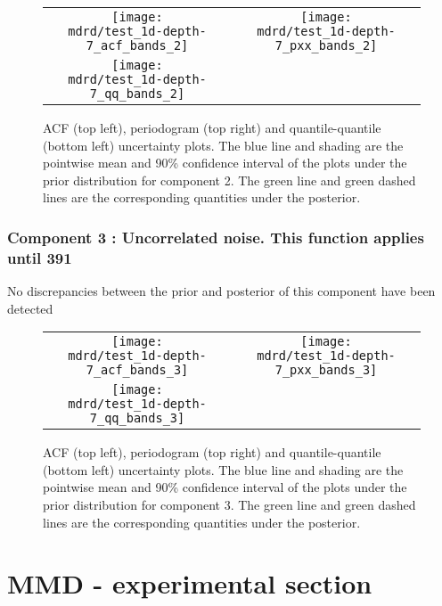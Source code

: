 \documentclass{article} %
\begin{document}
\begin{figure}[H]
\newcommand{\wmgd}{0.5\columnwidth}
\newcommand{\hmgd}{3.0cm}
\newcommand{\mdrd}{test_1d-depth-7}
\newcommand{\mbm}{\hspace{-0.3cm}}
\begin{tabular}{cc}
\mbm \texttt{[image: \\mdrd/test\_1d-depth-7\_acf\_bands\_2]} & \texttt{[image: \\mdrd/test\_1d-depth-7\_pxx\_bands\_2]} \\
\mbm \texttt{[image: \\mdrd/test\_1d-depth-7\_qq\_bands\_2]}
\end{tabular}
\caption{
ACF (top left), periodogram (top right) and quantile-quantile (bottom left) uncertainty plots.
The blue line and shading are the pointwise mean and 90\% confidence interval of the plots under the prior distribution for component 2.
The green line and green dashed lines are the corresponding quantities under the posterior.}
\label{fig:check2}
\end{figure}

\subsubsection{Component 3 : Uncorrelated noise. This function applies until  391}

No discrepancies between the prior and posterior of this component have been detected

\begin{figure}[H]
\newcommand{\wmgd}{0.5\columnwidth}
\newcommand{\hmgd}{3.0cm}
\newcommand{\mdrd}{test_1d-depth-7}
\newcommand{\mbm}{\hspace{-0.3cm}}
\begin{tabular}{cc}
\mbm \texttt{[image: \\mdrd/test\_1d-depth-7\_acf\_bands\_3]} & \texttt{[image: \\mdrd/test\_1d-depth-7\_pxx\_bands\_3]} \\
\mbm \texttt{[image: \\mdrd/test\_1d-depth-7\_qq\_bands\_3]}
\end{tabular}
\caption{
ACF (top left), periodogram (top right) and quantile-quantile (bottom left) uncertainty plots.
The blue line and shading are the pointwise mean and 90\% confidence interval of the plots under the prior distribution for component 3.
The green line and green dashed lines are the corresponding quantities under the posterior.}
\label{fig:check3}
\end{figure}

\section{MMD - experimental section}
\label{sec:mmd}
\end{document}
